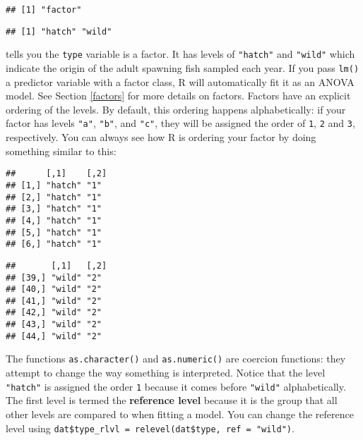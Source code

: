 \documentclass[]{book}
\newenvironment{Shaded}{\begin{snugshade}}{\end{snugshade}}
\newcommand{\KeywordTok}[1]{\textcolor[rgb]{0.13,0.29,0.53}{\textbf{#1}}}
\newcommand{\StringTok}[1]{\textcolor[rgb]{0.31,0.60,0.02}{#1}}
\newcommand{\OperatorTok}[1]{\textcolor[rgb]{0.81,0.36,0.00}{\textbf{#1}}}
\newcommand{\NormalTok}[1]{#1}
\theoremstyle{definition}
\theoremstyle{definition}
\theoremstyle{definition}
\theoremstyle{remark}
\begin{document}
\begin{verbatim}
## [1] "factor"
\end{verbatim}

\begin{verbatim}
## [1] "hatch" "wild"
\end{verbatim}

tells you the \texttt{type} variable is a factor. It has levels of
\texttt{"hatch"} and \texttt{"wild"} which indicate the origin of the
adult spawning fish sampled each year. If you pass \texttt{lm()} a
predictor variable with a factor class, R will automatically fit it as
an ANOVA model. See Section \ref{factors} for more details on factors.
Factors have an explicit ordering of the levels. By default, this
ordering happens alphabetically: if your factor has levels \texttt{"a"},
\texttt{"b"}, and \texttt{"c"}, they will be assigned the order of
\texttt{1}, \texttt{2} and \texttt{3}, respectively. You can always see
how R is ordering your factor by doing something similar to this:

\begin{Shaded}
\end{Shaded}

\begin{verbatim}
##      [,1]    [,2]
## [1,] "hatch" "1" 
## [2,] "hatch" "1" 
## [3,] "hatch" "1" 
## [4,] "hatch" "1" 
## [5,] "hatch" "1" 
## [6,] "hatch" "1"
\end{verbatim}

\begin{verbatim}
##       [,1]   [,2]
## [39,] "wild" "2" 
## [40,] "wild" "2" 
## [41,] "wild" "2" 
## [42,] "wild" "2" 
## [43,] "wild" "2" 
## [44,] "wild" "2"
\end{verbatim}

The functions \texttt{as.character()} and \texttt{as.numeric()} are
coercion functions: they attempt to change the way something is
interpreted. Notice that the level \texttt{"hatch"} is assigned the
order \texttt{1} because it comes before \texttt{"wild"} alphabetically.
The first level is termed the \textbf{reference level} because it is the
group that all other levels are compared to when fitting a model. You
can change the reference level using
\texttt{dat\$type\_rlvl\ =\ relevel(dat\$type,\ ref\ =\ "wild")}.
\end{document}
